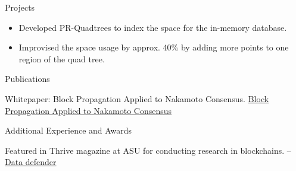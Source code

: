 \documentclass[]{mcdowellcv}
\begin{document}
    \begin{cvsection}{Projects}
        \begin{cvsubsection}{}{}{}
            \begin{cvsubsectionitem}
            \item {}
                \begin{itemize}
                    \item Developed PR-Quadtrees to index the space for the in-memory database.
                    \item Improvised the space usage by approx. 40\%  by adding more points to one region of the
                        quad tree.
                \end{itemize}

            \end{cvsubsectionitem}
        \end{cvsubsection}
    \end{cvsection}

    \begin{cvsection}{Publications}
        \begin{cvsubsection}{}{}{}
            \begin{cvsubsectionitem}
            \item Whitepaper: Block Propagation Applied to Nakamoto Consensus.
                \href{https://blockchain.asu.edu/block-propagation-applied-to-nakamoto-networks} {Block Propagation
                Applied to Nakamoto Consensus}
            \end{cvsubsectionitem}
        \end{cvsubsection}
    \end{cvsection}

    \begin{cvsection}{Additional Experience and Awards}
        \begin{cvsubsection}{}{}{}
            \begin{cvsubsectionitem}
            \item Featured in Thrive magazine at ASU for conducting research in blockchains. -- \href{https://asunow.asu.edu/20180327-solutions-asu-engineers-data-defenders}{Data defender}
            \end{cvsubsectionitem}
        \end{cvsubsection}
    \end{cvsection}
\end{document}
